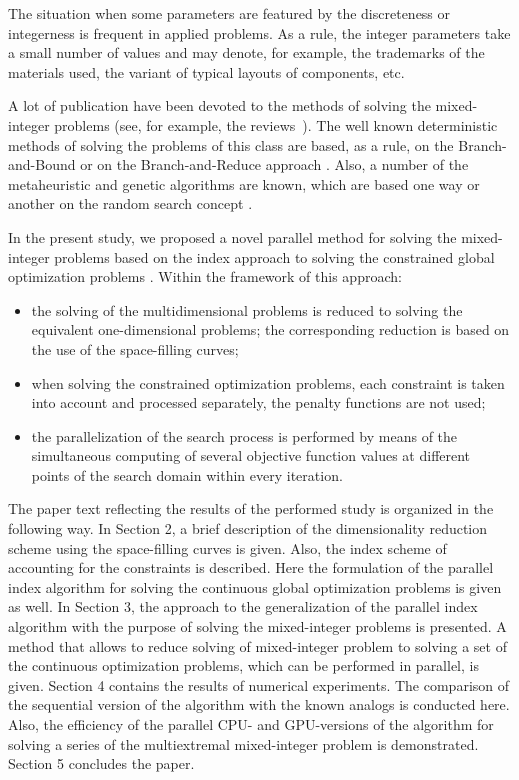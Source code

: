 \documentclass[runningheads]{llncs}
\begin{document}
The situation when some parameters are featured by the discreteness or integerness is frequent
in applied problems. As a rule, the integer parameters take a small number of values and may
denote, for example, the trademarks of the materials used, the variant of typical layouts of
components, etc.

A lot of publication have been devoted to the methods of solving the mixed-integer problems
(see, for example, the reviews~\cite{Burer,Boukouvala}). The well known deterministic
methods of solving the problems of this class are based, as a rule, on the Branch-and-Bound
\cite{Belotti} or on the Branch-and-Reduce approach \cite{Vigerske}. Also, a number of
the metaheuristic and genetic
algorithms are known, which are based one way or another on the random search concept
\cite{Deep,Schluter}.

In the present study, we proposed a novel parallel method for solving the mixed-integer
problems based on the index approach to solving the constrained global optimization
problems \cite{Strongin2000,Strongin2013}.
Within the framework of this approach:
\begin{itemize}
	\item
	the solving of the multidimensional problems is reduced to solving the equivalent one-dimensional problems; the corresponding reduction is based on the use of the space-filling curves;
	\item
	when solving the constrained optimization problems, each constraint is taken into
account and processed separately, the penalty functions are not used;
	\item
	the parallelization of the search process is performed by means of the simultaneous
computing of several objective function values at different points of the search domain within
every iteration.
\end{itemize}

The paper text reflecting the results of the performed study is organized in the following way.
In Section 2, a brief description of the dimensionality reduction scheme using the space-filling
curves is given. Also, the index scheme of accounting for the constraints is described. Here the
formulation of the parallel index algorithm for solving the continuous global optimization
problems is given as well.
In Section 3, the approach to the generalization of the parallel index algorithm with the purpose
of solving the mixed-integer problems is presented. A method that allows to reduce solving of
mixed-integer problem to solving a set of the continuous optimization problems, which can be
performed in parallel, is given.
Section 4 contains the results of numerical experiments. The comparison of the sequential
version of the algorithm with the known analogs is conducted here. Also, the efficiency of the
parallel CPU- and GPU-versions of the algorithm for solving a series of the multiextremal
mixed-integer problem is demonstrated.
Section 5 concludes the paper.
\end{document}
